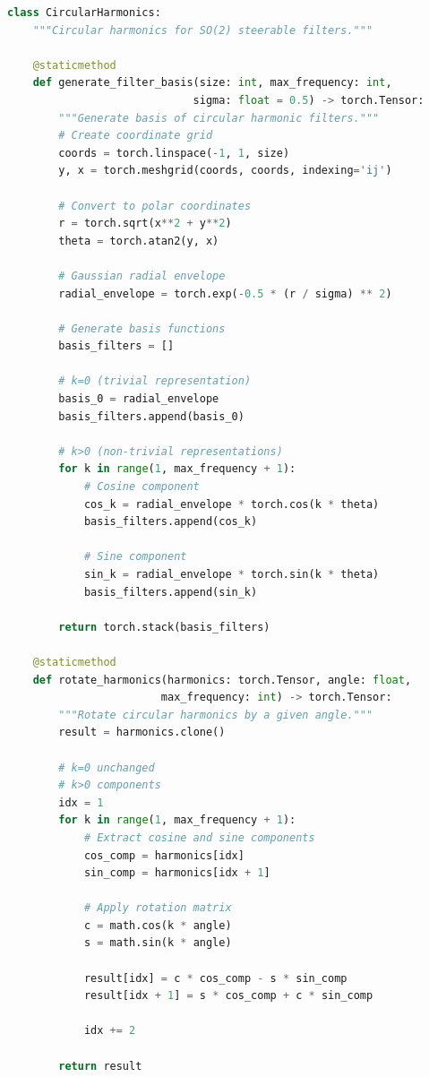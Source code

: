 \begin{listing}[h]
\begin{lstlisting}[language=Python]
class CircularHarmonics:
    """Circular harmonics for SO(2) steerable filters."""

    @staticmethod
    def generate_filter_basis(size: int, max_frequency: int,
                             sigma: float = 0.5) -> torch.Tensor:
        """Generate basis of circular harmonic filters."""
        # Create coordinate grid
        coords = torch.linspace(-1, 1, size)
        y, x = torch.meshgrid(coords, coords, indexing='ij')

        # Convert to polar coordinates
        r = torch.sqrt(x**2 + y**2)
        theta = torch.atan2(y, x)

        # Gaussian radial envelope
        radial_envelope = torch.exp(-0.5 * (r / sigma) ** 2)

        # Generate basis functions
        basis_filters = []

        # k=0 (trivial representation)
        basis_0 = radial_envelope
        basis_filters.append(basis_0)

        # k>0 (non-trivial representations)
        for k in range(1, max_frequency + 1):
            # Cosine component
            cos_k = radial_envelope * torch.cos(k * theta)
            basis_filters.append(cos_k)

            # Sine component
            sin_k = radial_envelope * torch.sin(k * theta)
            basis_filters.append(sin_k)

        return torch.stack(basis_filters)

    @staticmethod
    def rotate_harmonics(harmonics: torch.Tensor, angle: float,
                        max_frequency: int) -> torch.Tensor:
        """Rotate circular harmonics by a given angle."""
        result = harmonics.clone()

        # k=0 unchanged
        # k>0 components
        idx = 1
        for k in range(1, max_frequency + 1):
            # Extract cosine and sine components
            cos_comp = harmonics[idx]
            sin_comp = harmonics[idx + 1]

            # Apply rotation matrix
            c = math.cos(k * angle)
            s = math.sin(k * angle)

            result[idx] = c * cos_comp - s * sin_comp
            result[idx + 1] = s * cos_comp + c * sin_comp

            idx += 2

        return result
\end{lstlisting}
\caption{Generation and rotation of circular harmonics}
\label{code:circular_harmonics}
\end{listing}


